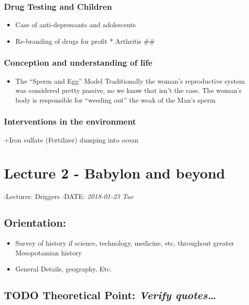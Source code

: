 \documentclass[11pt]{article}
\begin{document}
\subsubsection{Drug Testing and Children}
\label{sec-2.2.2}


\begin{itemize}
\item Case of anti-depressants and adolescents
\item Re-branding of drugs for profit * Arthritis \##
\end{itemize}
\subsubsection{Conception and understanding of life}
\label{sec-2.2.3}


\begin{itemize}
\item The ``Sperm and Egg'' Model Traditionally the woman's reproductive system was considered pretty passive, no we know that isn't the case. The woman's body is responsible for ``weeding out'' the weak of the Man's sperm
\end{itemize}
\subsubsection{Interventions in the environment}
\label{sec-2.2.4}


+Iron sulfate (Fertilizer) dumping into ocean

\section{Lecture 2 - Babylon and beyond}
\label{sec-3}

:Lecturer: Driggers
:DATE: \textit{2018-01-23 Tue}

\subsection{Orientation:}
\label{sec-3.1}

\begin{itemize}
\item Survey of history if science, technology, medicine, etc. throughout greater Mesopotamian history
\item General Details, geography, Etc.
\end{itemize}
\subsection{\textbf{TODO} Theoretical Point: \emph{Verify quotes\ldots{}}}
\label{sec-3.2}
\end{document}
